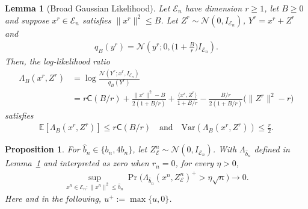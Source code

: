 \documentclass[10pt,a4paper]{amsart}
\newtheorem{lemma}{Lemma}
\newtheorem{proposition}{Proposition}
\newcommand{\bbE}{\mathbb{E}}
\newcommand{\calE}{\mathcal{E}}
\newcommand{\calN}{\mathcal{N}}
\newcommand{\hatb}{\hat{b}}
\newcommand{\nn}{\nonumber}
\newcommand{\rvC}{\mathsf{C}}
\begin{document}
\begin{lemma}[Broad Gaussian Likelihood] \label{lem:broad_gauss}
    Let $\calE_n$ have dimension $r\ge1$, let $B\ge 0$ and suppose $x^r\in \calE_n$ satisfies $\|x^r\|^2\le B$. Let $Z^r\sim\calN(0,I_{\calE_n})$, $Y^r=x^r+Z^r$ and 
    \begin{align}
        q_B (y^r)= \calN\left(y^r;0,\Big( 1+\frac{B}{r}\Big) I_{\calE_n}\right).
    \end{align}
    Then, the log-likelihood ratio 
    \begin{align}
        \Lambda_B(x^r,Z^r) &= \log\frac{\calN(Y^r;x^r, I_{\calE_n})}{q_B  (Y^r)} \nn\\
        &=r\rvC(B/r)+ \frac{ \|x^r\|^2-B}{2(1+B/r)}+ \frac{\langle x^r,Z^r\rangle}{1+B/r}- \frac{B/r}{2(1+B/r)} \big(\|Z^r\|^2-r\big) \label{eqn:Lambda_B}
    \end{align}
    satisfies
    \begin{align}
        \bbE[ \Lambda_B(x^r,Z^r)]\le r\rvC(B/r)\quad\mbox{and}\quad \mathrm{Var}( \Lambda_B(x^r,Z^r))\le\frac{r}{2}.
    \end{align}
\end{lemma}

\begin{proposition} \label{prop:excep_likeli}
    For $\hatb_n \in \{b_n,4b_n\}$, let $Z_\calE^n\sim\calN(0,I_{\calE_n})$. With $\Lambda_{\hatb_n}$ defined in Lemma~\ref{lem:broad_gauss}  and interpreted as zero when $r_n=0$, for every $\eta>0$,
    \begin{align}
        \sup_{x^n \in \calE_n : \|x^n\|^2\le\hatb_n}\Pr\big( \Lambda_{\hatb_n}(x^n,Z_\calE^n)^+>\eta\sqrt{n} \big)\to0. \label{eqn:prop_cheby}
    \end{align}
    Here and in the following, $u^+:=\max\{u,0\}$. 
\end{proposition}
\end{document}
